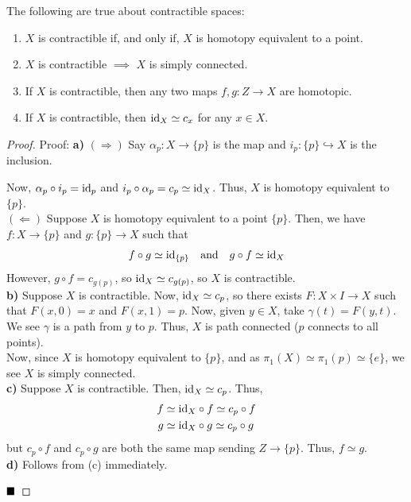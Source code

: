\begin{lemma}
    The following are true about contractible spaces:
    \begin{enumerate}[label=\alph*.]
        \item $X$ is contractible if, and only if, $X$ is homotopy equivalent to a point.
        \item $X$ is contractible $\implies$ $X$ is simply connected.
        \item If $X$ is contractible, then any two maps $f, g : Z \to X$ are homotopic.
        \item If $X$ is contractible, then $\text{id}_X \simeq c_x$ for any $x \in X$.
    \end{enumerate}
\end{lemma}
\begin{proof}{Proof:}
    \textbf{a)} $(\Rightarrow)$ Say $\alpha_p : X \to \{p\}$ is the map and $i_p : \{p\} \hookrightarrow X$ is the inclusion.
    \begin{center}
    \end{center}
    Now, $\alpha_p \circ i_p = \text{id}_p$ and $i_p \circ \alpha_p = c_p \simeq \text{id}_X$. Thus, $X$ is homotopy equivalent to $\{p\}$.\\

    $(\Leftarrow)$ Suppose $X$ is homotopy equivalent to a point $\{p\}$. Then, we have $f : X \to \{p\}$ and $g : \{p\} \to X$ such that
    \[ f \circ g \simeq \text{id}_{\{p\}} \quad \text{and} \quad g \circ f \simeq \text{id}_X \]
    However, $g \circ f = c_{g(p)}$, so $\text{id}_X \simeq c_{g(p)}$, so $X$ is contractible.\\

    \textbf{b)} Suppose $X$ is contractible. Now, $\text{id}_X \simeq c_p$, so there exists $F : X \times I \to X$ such that $F(x, 0) = x$ and $F(x, 1) = p$. Now, given $y \in X$, take $\gamma(t) = F(y, t)$. We see $\gamma$ is a path from $y$ to $p$. Thus, $X$ is path connected ($p$ connects to all points).\\

    Now, since $X$ is homotopy equivalent to $\{p\}$, and as $\pi_1(X) \simeq \pi_1(p) \simeq \{e\}$, we see $X$ is simply connected.\\

    \textbf{c)} Suppose $X$ is contractible. Then, $\text{id}_X \simeq c_p$. Thus,
    \begin{align*}
        f &\simeq \text{id}_X \circ f \simeq c_p \circ f\\
        g &\simeq \text{id}_X \circ g \simeq c_p \circ g
    \end{align*}
    but $c_p \circ f$ and $c_p \circ g$ are both the same map sending $Z \to \{p\}$. Thus, $f \simeq g$.\\

    \textbf{d)} Follows from (c) immediately.

    $\qed$
\end{proof}

